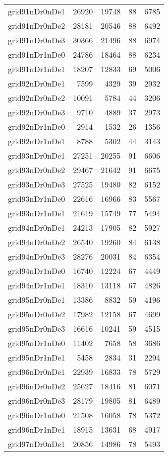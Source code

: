 \begin{longtable}{lrrrr}
grid91nDr0nDe1 & 26920 & 19748 & 88 & 6785 \\
grid91nDr0nDe2 & 28181 & 20546 & 88 & 6492 \\
grid91nDr0nDe3 & 30366 & 21496 & 88 & 6974 \\
grid91nDr1nDe0 & 24786 & 18464 & 88 & 6234 \\
grid91nDr1nDe1 & 18207 & 12833 & 69 & 5006 \\
grid92nDr0nDe1 & 7599 & 4329 & 39 & 2932 \\
grid92nDr0nDe2 & 10091 & 5784 & 44 & 3206 \\
grid92nDr0nDe3 & 9710 & 4889 & 37 & 2973 \\
grid92nDr1nDe0 & 2914 & 1532 & 26 & 1356 \\
grid92nDr1nDe1 & 8788 & 5302 & 44 & 3143 \\
grid93nDr0nDe1 & 27251 & 20255 & 91 & 6606 \\
grid93nDr0nDe2 & 29467 & 21642 & 91 & 6675 \\
grid93nDr0nDe3 & 27525 & 19480 & 82 & 6152 \\
grid93nDr1nDe0 & 22616 & 16966 & 83 & 5567 \\
grid93nDr1nDe1 & 21619 & 15749 & 77 & 5494 \\
grid94nDr0nDe1 & 24213 & 17905 & 82 & 5927 \\
grid94nDr0nDe2 & 26540 & 19260 & 84 & 6138 \\
grid94nDr0nDe3 & 28276 & 20031 & 84 & 6354 \\
grid94nDr1nDe0 & 16740 & 12224 & 67 & 4449 \\
grid94nDr1nDe1 & 18310 & 13118 & 67 & 4826 \\
grid95nDr0nDe1 & 13386 & 8832 & 59 & 4196 \\
grid95nDr0nDe2 & 17982 & 12158 & 67 & 4699 \\
grid95nDr0nDe3 & 16616 & 10241 & 59 & 4515 \\
grid95nDr1nDe0 & 11402 & 7658 & 58 & 3686 \\
grid95nDr1nDe1 & 5458 & 2834 & 31 & 2294 \\
grid96nDr0nDe1 & 22939 & 16833 & 78 & 5729 \\
grid96nDr0nDe2 & 25627 & 18416 & 81 & 6071 \\
grid96nDr0nDe3 & 28179 & 19805 & 81 & 6489 \\
grid96nDr1nDe0 & 21508 & 16058 & 78 & 5372 \\
grid96nDr1nDe1 & 18915 & 13631 & 68 & 4917 \\
grid97nDr0nDe1 & 20856 & 14986 & 78 & 5493 \\

\end{longtable}
